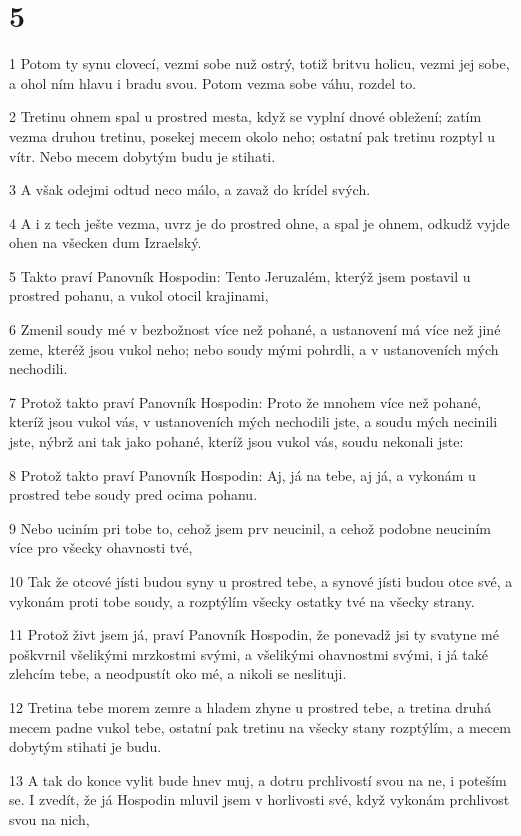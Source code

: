 \chapter{5}

\par 1 Potom ty synu clovecí, vezmi sobe nuž ostrý, totiž britvu holicu, vezmi jej sobe, a ohol ním hlavu i bradu svou. Potom vezma sobe váhu, rozdel to.
\par 2 Tretinu ohnem spal u prostred mesta, když se vyplní dnové obležení; zatím vezma druhou tretinu, posekej mecem okolo neho; ostatní pak tretinu rozptyl u vítr. Nebo mecem dobytým budu je stihati.
\par 3 A však odejmi odtud neco málo, a zavaž do krídel svých.
\par 4 A i z tech ješte vezma, uvrz je do prostred ohne, a spal je ohnem, odkudž vyjde ohen na všecken dum Izraelský.
\par 5 Takto praví Panovník Hospodin: Tento Jeruzalém, kterýž jsem postavil u prostred pohanu, a vukol otocil krajinami,
\par 6 Zmenil soudy mé v bezbožnost více než pohané, a ustanovení má více než jiné zeme, kteréž jsou vukol neho; nebo soudy mými pohrdli, a v ustanoveních mých nechodili.
\par 7 Protož takto praví Panovník Hospodin: Proto že mnohem více než pohané, kteríž jsou vukol vás, v ustanoveních mých nechodili jste, a soudu mých necinili jste, nýbrž ani tak jako pohané, kteríž jsou vukol vás, soudu nekonali jste:
\par 8 Protož takto praví Panovník Hospodin: Aj, já na tebe, aj já, a vykonám u prostred tebe soudy pred ocima pohanu.
\par 9 Nebo uciním pri tobe to, cehož jsem prv neucinil, a cehož podobne neuciním více pro všecky ohavnosti tvé,
\par 10 Tak že otcové jísti budou syny u prostred tebe, a synové jísti budou otce své, a vykonám proti tobe soudy, a rozptýlím všecky ostatky tvé na všecky strany.
\par 11 Protož živt jsem já, praví Panovník Hospodin, že ponevadž jsi ty svatyne mé poškvrnil všelikými mrzkostmi svými, a všelikými ohavnostmi svými, i já také zlehcím tebe, a neodpustít oko mé, a nikoli se neslituji.
\par 12 Tretina tebe morem zemre a hladem zhyne u prostred tebe, a tretina druhá mecem padne vukol tebe, ostatní pak tretinu na všecky stany rozptýlím, a mecem dobytým stihati je budu.
\par 13 A tak do konce vylit bude hnev muj, a dotru prchlivostí svou na ne, i poteším se. I zvedít, že já Hospodin mluvil jsem v horlivosti své, když vykonám prchlivost svou na nich,
